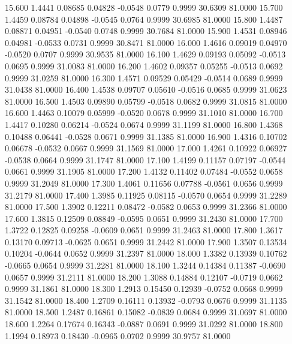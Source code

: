   15.600   1.4441   0.08685   0.04828  -0.0548   0.0779   0.9999  30.6309  81.0000
  15.700   1.4459   0.08784   0.04898  -0.0545   0.0764   0.9999  30.6985  81.0000
  15.800   1.4487   0.08871   0.04951  -0.0540   0.0748   0.9999  30.7684  81.0000
  15.900   1.4531   0.08946   0.04981  -0.0533   0.0731   0.9999  30.8471  81.0000
  16.000   1.4616   0.09019   0.04970  -0.0520   0.0707   0.9999  30.9535  81.0000
  16.100   1.4629   0.09193   0.05092  -0.0513   0.0695   0.9999  31.0083  81.0000
  16.200   1.4602   0.09357   0.05255  -0.0513   0.0692   0.9999  31.0259  81.0000
  16.300   1.4571   0.09529   0.05429  -0.0514   0.0689   0.9999  31.0438  81.0000
  16.400   1.4538   0.09707   0.05610  -0.0516   0.0685   0.9999  31.0623  81.0000
  16.500   1.4503   0.09890   0.05799  -0.0518   0.0682   0.9999  31.0815  81.0000
  16.600   1.4463   0.10079   0.05999  -0.0520   0.0678   0.9999  31.1010  81.0000
  16.700   1.4417   0.10280   0.06214  -0.0524   0.0674   0.9999  31.1199  81.0000
  16.800   1.4368   0.10488   0.06441  -0.0528   0.0671   0.9999  31.1385  81.0000
  16.900   1.4316   0.10702   0.06678  -0.0532   0.0667   0.9999  31.1569  81.0000
  17.000   1.4261   0.10922   0.06927  -0.0538   0.0664   0.9999  31.1747  81.0000
  17.100   1.4199   0.11157   0.07197  -0.0544   0.0661   0.9999  31.1905  81.0000
  17.200   1.4132   0.11402   0.07484  -0.0552   0.0658   0.9999  31.2049  81.0000
  17.300   1.4061   0.11656   0.07788  -0.0561   0.0656   0.9999  31.2179  81.0000
  17.400   1.3985   0.11925   0.08115  -0.0570   0.0654   0.9999  31.2289  81.0000
  17.500   1.3902   0.12211   0.08472  -0.0582   0.0653   0.9999  31.2366  81.0000
  17.600   1.3815   0.12509   0.08849  -0.0595   0.0651   0.9999  31.2430  81.0000
  17.700   1.3722   0.12825   0.09258  -0.0609   0.0651   0.9999  31.2463  81.0000
  17.800   1.3617   0.13170   0.09713  -0.0625   0.0651   0.9999  31.2442  81.0000
  17.900   1.3507   0.13534   0.10204  -0.0644   0.0652   0.9999  31.2397  81.0000
  18.000   1.3382   0.13939   0.10762  -0.0665   0.0654   0.9999  31.2281  81.0000
  18.100   1.3244   0.14384   0.11387  -0.0690   0.0657   0.9999  31.2111  81.0000
  18.200   1.3088   0.14884   0.12107  -0.0719   0.0662   0.9999  31.1861  81.0000
  18.300   1.2913   0.15450   0.12939  -0.0752   0.0668   0.9999  31.1542  81.0000
  18.400   1.2709   0.16111   0.13932  -0.0793   0.0676   0.9999  31.1135  81.0000
  18.500   1.2487   0.16861   0.15082  -0.0839   0.0684   0.9999  31.0697  81.0000
  18.600   1.2264   0.17674   0.16343  -0.0887   0.0691   0.9999  31.0292  81.0000
  18.800   1.1994   0.18973   0.18430  -0.0965   0.0702   0.9999  30.9757  81.0000
